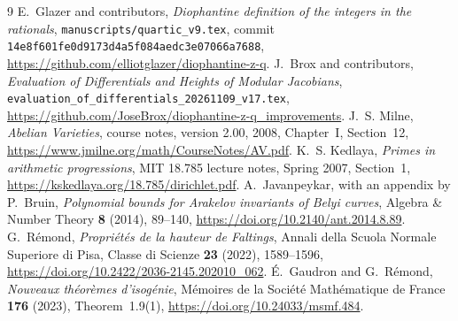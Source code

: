 \documentclass[11pt,a4paper]{article}
\theoremstyle{definition}\newtheorem{remark}[theorem]{Remark}
\begin{document}
\begin{thebibliography}{9}\small
{}
E.~Glazer and contributors, \emph{Diophantine definition of the integers
in the rationals}, \texttt{manuscripts/quartic\_v9.tex}, commit
\texttt{14e8f601fe0d9173d4a5f084aedc3e07066a7688},
\url{https://github.com/elliotglazer/diophantine-z-q}.
J.~Brox and contributors, \emph{Evaluation of Differentials and Heights
of Modular Jacobians},
\texttt{evaluation\_of\_differentials\_20261109\_v17.tex},
\url{https://github.com/JoseBrox/diophantine-z-q_improvements}.
J.~S. Milne, \emph{Abelian Varieties}, course notes, version 2.00,
2008, Chapter~I, Section~12,
\url{https://www.jmilne.org/math/CourseNotes/AV.pdf}.
K.~S. Kedlaya, \emph{Primes in arithmetic progressions},
MIT 18.785 lecture notes, Spring 2007, Section~1,
\url{https://kskedlaya.org/18.785/dirichlet.pdf}.
A.~Javanpeykar, with an appendix by P.~Bruin,
\emph{Polynomial bounds for Arakelov invariants of Belyi curves},
Algebra \& Number Theory \textbf{8} (2014), 89--140,
\url{https://doi.org/10.2140/ant.2014.8.89}.
G.~R\'emond, \emph{Propri\'et\'es de la hauteur de Faltings},
Annali della Scuola Normale Superiore di Pisa, Classe di Scienze
\textbf{23} (2022), 1589--1596,
\url{https://doi.org/10.2422/2036-2145.202010_062}.
\'E.~Gaudron and G.~R\'emond,
\emph{Nouveaux th\'eor\`emes d'isog\'enie},
M\'emoires de la Soci\'et\'e Math\'ematique de France
\textbf{176} (2023), Theorem~1.9(1),
\url{https://doi.org/10.24033/msmf.484}.
\end{thebibliography}
\end{document}
